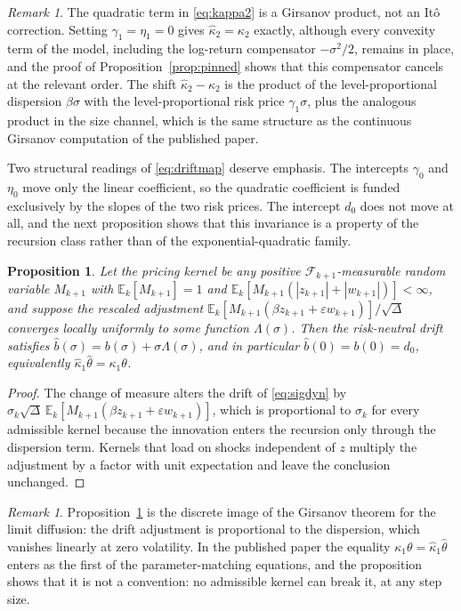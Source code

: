 \documentclass[11pt]{article}
\newtheorem{proposition}[theorem]{Proposition}
\theoremstyle{remark}
\newtheorem{remark}[theorem]{Remark}
\newcommand{\E}{\mathbb{E}}
\newcommand{\Dt}{\Delta}
\begin{document}
\begin{remark}\label{rem:ito}
The quadratic term in \eqref{eq:kappa2} is a Girsanov product, not an
It\^{o} correction.
Setting $\gamma_1=\eta_1=0$ gives $\hat\kappa_2=\kappa_2$ exactly, although
every convexity term of the model, including the log-return compensator
$-\sigma^2/2$, remains in place, and the proof of
Proposition~\ref{prop:pinned} shows that this compensator cancels at the
relevant order.
The shift $\hat\kappa_2-\kappa_2$ is the product of the level-proportional
dispersion $\beta\sigma$ with the level-proportional risk price
$\gamma_1\sigma$, plus the analogous product in the size channel, which is
the same structure as the continuous Girsanov computation of the published
paper.
\end{remark}

Two structural readings of \eqref{eq:driftmap} deserve emphasis.
The intercepts $\gamma_0$ and $\eta_0$ move only the linear coefficient, so
the quadratic coefficient is funded exclusively by the slopes of the two
risk prices.
The intercept $d_0$ does not move at all, and the next proposition shows
that this invariance is a property of the recursion class rather than of
the exponential-quadratic family.

\begin{proposition}\label{prop:invariance}
Let the pricing kernel be any positive $\mathcal{F}_{k+1}$-measurable
random variable $M_{k+1}$ with $\E_k[M_{k+1}]=1$ and
$\E_k[M_{k+1}(|z_{k+1}|+|w_{k+1}|)]<\infty$, and suppose the rescaled
adjustment
$\E_k[M_{k+1}(\beta z_{k+1}+\varepsilon w_{k+1})]/\sqrt{\Dt}$ converges
locally uniformly to some function $\Lambda(\sigma)$.
Then the risk-neutral drift satisfies
$\hat b(\sigma)=b(\sigma)+\sigma\Lambda(\sigma)$, and in particular
$\hat b(0)=b(0)=d_0$, equivalently
$\hat\kappa_1\hat\theta=\kappa_1\theta$.
\end{proposition}

\begin{proof}
The change of measure alters the drift of \eqref{eq:sigdyn} by
$\sigma_k\sqrt{\Dt}\,\E_k[M_{k+1}(\beta z_{k+1}+\varepsilon w_{k+1})]$,
which is proportional to $\sigma_k$ for every admissible kernel because the
innovation enters the recursion only through the dispersion term.
Kernels that load on shocks independent of $z$ multiply the adjustment by a
factor with unit expectation and leave the conclusion unchanged.
\end{proof}

\begin{remark}
Proposition~\ref{prop:invariance} is the discrete image of the Girsanov
theorem for the limit diffusion: the drift adjustment is proportional to
the dispersion, which vanishes linearly at zero volatility.
In the published paper the equality $\kappa_1\theta=\hat\kappa_1\hat\theta$
enters as the first of the parameter-matching equations, and the
proposition shows that it is not a convention: no admissible kernel can
break it, at any step size.
\end{remark}
\end{document}
